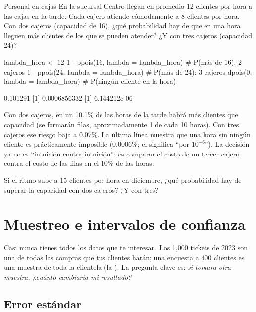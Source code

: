 \begin{ejemplo}{Personal en cajas}
En la sucursal Centro llegan en promedio 12 clientes por hora a las cajas
en la tarde. Cada cajero atiende cómodamente a 8 clientes por hora. Con dos
cajeros (capacidad de 16), ¿qué probabilidad hay de que en una hora lleguen
más clientes de los que se pueden atender? ¿Y con tres cajeros
(capacidad 24)?
\end{ejemplo}

\begin{rcode}
lambda_hora <- 12
1 - ppois(16, lambda = lambda_hora)   # P(más de 16): 2 cajeros
1 - ppois(24, lambda = lambda_hora)   # P(más de 24): 3 cajeros
dpois(0, lambda = lambda_hora)        # P(ningún cliente en la hora)
\end{rcode}
\begin{rsalida}
[1] 0.101291
[1] 0.0006856332
[1] 6.144212e-06
\end{rsalida}

Con dos cajeros, en un 10.1\% de las horas de la tarde habrá más clientes
que capacidad (se formarán filas, aproximadamente 1 de cada 10 horas). Con
tres cajeros ese riesgo baja a 0.07\%. La última línea muestra que una hora
sin ningún cliente es prácticamente imposible (0.0006\%; el
 significa ``por $10^{-6}$''). La decisión ya no es ``intuición
contra intuición'': es comparar el costo de un tercer cajero contra el costo
de las filas en el 10\% de las horas.

\begin{hazlotu}
Si el ritmo sube a 15 clientes por hora en diciembre, ¿qué probabilidad hay
de superar la capacidad con dos cajeros? ¿Y con tres?
\end{hazlotu}

\section{Muestreo e intervalos de confianza}
\label{sec:m4-intervalos}

Casi nunca tienes todos los datos que te interesan. Los 1,000 tickets de
2023 son una  de todas las compras que tus clientes harán;
una encuesta a 400 clientes es una muestra de toda la clientela (la
). La pregunta clave es: \emph{si tomara otra muestra,
¿cuánto cambiaría mi resultado?}

\subsection{Error estándar}

